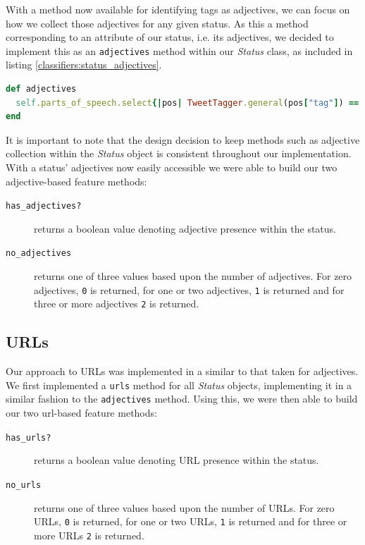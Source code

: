 With a method now available for identifying tags as adjectives, we can focus on how we collect those adjectives for any given status. As this a method corresponding to an attribute of our status, i.e. its adjectives, we decided to implement this as an \texttt{adjectives} method within our \emph{Status} class, as included in listing \ref{classifiers:status_adjectives}.

\begin{lstlisting}[language=Ruby, caption={\emph{Status} object's \texttt{adjective} method for returning all parts of speech used as adjectives}, label=classifiers:status_adjectives]
def adjectives
  self.parts_of_speech.select{|pos| TweetTagger.general(pos["tag"]) == "adj"}
end
\end{lstlisting}

It is important to note that the design decision to keep methods such as adjective collection within the \emph{Status} object is consistent throughout our implementation. With a status' adjectives now easily accessible we were able to build our two adjective-based feature methods:

\begin{description}
	\item [\texttt{has\_adjectives?}] returns a boolean value denoting adjective presence within the status.
	\item [\texttt{no\_adjectives}] returns one of three values based upon the number of adjectives. For zero adjectives, \texttt{0} is returned, for one or two adjectives, \texttt{1} is returned and for three or more adjectives \texttt{2} is returned.
\end{description}

\subsection{URLs}

Our approach to URLs was implemented in a similar to that taken for adjectives. We first implemented a \texttt{urls} method for all \emph{Status} objects, implementing it in a similar fashion to the \texttt{adjectives} method. Using this, we were then able to build our two url-based feature methods:

\begin{description}
	\item [\texttt{has\_urls?}] returns a boolean value denoting URL presence within the status.
	\item [\texttt{no\_urls}] returns one of three values based upon the number of URLs. For zero URLs, \texttt{0} is returned, for one or two URLs, \texttt{1} is returned and for three or more URLs \texttt{2} is returned.
\end{description}

